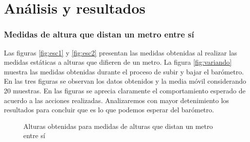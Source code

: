 \documentclass[spanish,12pt,a4paper,titlepage]{report}
\begin{document}
\section{Análisis y resultados}



\subsubsection*{Medidas de altura que distan un metro entre sí}

Las figuras \ref{fig:esc1} y \ref{fig:esc2} presentan las medidas obtenidas al realizar las medidas estáticas a alturas que difieren de un metro. La figura \ref{fig:variando} muestra las medidas obtenidas durante el proceso de subir y bajar el barómetro. En las tres figuras se observan los datos obtenidos y la media móvil considerando 20 muestras. En las figuras se aprecia claramente el comportamiento esperado de acuerdo a las acciones realizadas. Analizaremos con mayor detenimiento los resultados para concluir que es lo que podemos esperar del barómetro.

\begin{figure}
  \begin{center}
  \end{center}
  \caption{Alturas obtenidas para medidas de alturas que distan un metro entre sí}
\end{figure}
\end{document}
